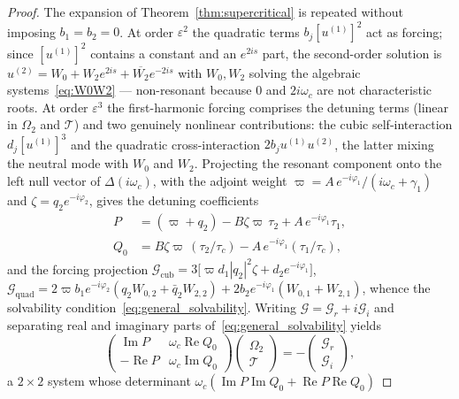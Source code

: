 \documentclass[sn-mathphys,Numbered]{sn-jnl}
\theoremstyle{thmstyleone}
\theoremstyle{thmstyletwo}
\theoremstyle{thmstylethree}
\begin{document}
\begin{proof}
The expansion of Theorem~\ref{thm:supercritical} is repeated without
imposing $b_1=b_2=0$. At order $\varepsilon^{2}$ the quadratic terms
$b_j[u^{(1)}]^{2}$ act as forcing; since $[u^{(1)}]^{2}$ contains a
constant and an $e^{2is}$ part, the second-order solution is
$u^{(2)}=W_0+W_2e^{2is}+\overline{W_2}e^{-2is}$ with $W_0,W_2$
solving the algebraic systems~\eqref{eq:W0W2} --- non-resonant because
$0$ and $2i\omega_c$ are not characteristic roots. At order
$\varepsilon^{3}$ the first-harmonic forcing comprises the detuning
terms (linear in $\Omega_2$ and $\mathcal{T}$) and two genuinely nonlinear
contributions: the cubic self-interaction $d_j[u^{(1)}]^{3}$ and the
quadratic cross-interaction $2b_ju^{(1)}u^{(2)}$, the latter mixing the
neutral mode with $W_0$ and $W_2$. Projecting the resonant component
onto the left null vector of $\Delta(i\omega_c)$, with the adjoint
weight $\varpi=A\,e^{-i\varphi_1}/(i\omega_c+\gamma_1)$ and
$\zeta=q_2e^{-i\varphi_2}$, gives the detuning coefficients
\begin{equation}
\begin{aligned}
P   &= (\varpi+q_2)-B\zeta\varpi\,\tau_2+A\,e^{-i\varphi_1}\tau_1,\\
Q_0 &= B\zeta\varpi\,(\tau_2/\tau_c)-A\,e^{-i\varphi_1}(\tau_1/\tau_c),
\end{aligned}
\label{eq:PQ_def}
\end{equation}
and the forcing projection
$\mathcal{G}_{\mathrm{cub}}
=3\bigl[\varpi d_1|q_2|^{2}\zeta+d_2e^{-i\varphi_1}\bigr]$,
$\mathcal{G}_{\mathrm{quad}}
=2\varpi b_1e^{-i\varphi_2}(q_2W_{0,2}+\bar q_2W_{2,2})
+2b_2e^{-i\varphi_1}(W_{0,1}+W_{2,1})$,
whence the solvability condition~\eqref{eq:general_solvability}.
Writing $\mathcal{G}=\mathcal{G}_r+i\mathcal{G}_i$ and separating real
and imaginary parts of~\eqref{eq:general_solvability} yields
\[
\begin{pmatrix}\operatorname{Im}P & \omega_c\operatorname{Re}Q_0\\[2pt]
-\operatorname{Re}P & \omega_c\operatorname{Im}Q_0\end{pmatrix}
\begin{pmatrix}\Omega_2\\ \mathcal{T}\end{pmatrix}
=-\begin{pmatrix}\mathcal{G}_r\\ \mathcal{G}_i\end{pmatrix},
\]
a $2\times2$ system whose determinant
$\omega_c(\operatorname{Im}P\operatorname{Im}Q_0+\operatorname{Re}P\operatorname{Re}Q_0)$

\end{proof}
\end{document}
